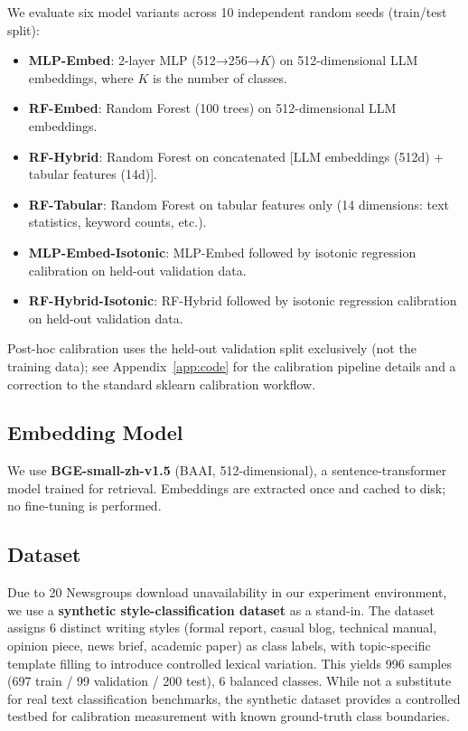 \documentclass[11pt]{article}
\begin{document}
We evaluate six model variants across 10 independent random seeds (train/test split):

\begin{itemize}[leftmargin=*,nosep]
 \item \textbf{MLP-Embed}: 2-layer MLP (512→256→$K$) on 512-dimensional LLM embeddings, where $K$ is the number of classes.
 \item \textbf{RF-Embed}: Random Forest (100 trees) on 512-dimensional LLM embeddings.
 \item \textbf{RF-Hybrid}: Random Forest on concatenated [LLM embeddings (512d) + tabular features (14d)].
 \item \textbf{RF-Tabular}: Random Forest on tabular features only (14 dimensions: text statistics, keyword counts, etc.).
 \item \textbf{MLP-Embed-Isotonic}: MLP-Embed followed by isotonic regression calibration on held-out validation data.
 \item \textbf{RF-Hybrid-Isotonic}: RF-Hybrid followed by isotonic regression calibration on held-out validation data.
\end{itemize}

Post-hoc calibration uses the held-out validation split exclusively (not the training data); see Appendix~\ref{app:code} for the calibration pipeline details and a correction to the standard sklearn calibration workflow.

\subsection{Embedding Model}

We use \textbf{BGE-small-zh-v1.5} (BAAI, 512-dimensional), a sentence-transformer model trained for retrieval. Embeddings are extracted once and cached to disk; no fine-tuning is performed.

\subsection{Dataset}

Due to 20 Newsgroups download unavailability in our experiment environment, we use a \textbf{synthetic style-classification dataset} as a stand-in. The dataset assigns 6 distinct writing styles (formal report, casual blog, technical manual, opinion piece, news brief, academic paper) as class labels, with topic-specific template filling to introduce controlled lexical variation. This yields 996 samples (697 train / 99 validation / 200 test), 6 balanced classes. While not a substitute for real text classification benchmarks, the synthetic dataset provides a controlled testbed for calibration measurement with known ground-truth class boundaries.
\end{document}
